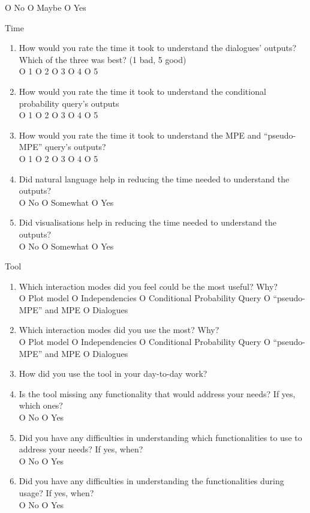 \begin{mdframed}
\begin{enumerate}[resume]
		O No O Maybe O Yes\\
	\end{enumerate}
	{\Large Time}
	\begin{enumerate}[resume]
		\item How would you rate the time it took to understand the dialogues' outputs?  Which of the three was best? (1 bad, 5 good) \\
		O 1 O 2 O 3 O 4 O 5
		\item How would you rate the time it took to understand the conditional probability query's outputs \\
		O 1 O 2 O 3 O 4 O 5
		\item How would you rate the time it took to understand the MPE and \enquote{pseudo-MPE} query's outputs? \\
		O 1 O 2 O 3 O 4 O 5
		\item Did natural language help in reducing the time needed to understand the outputs? \\
		O No O Somewhat O Yes
		\item Did visualisations help in reducing the time needed to understand the outputs? \\
		O No O Somewhat O Yes
	\end{enumerate}
	{\Large Tool}
	\begin{enumerate}[resume]
		\item Which interaction modes did you feel could be the most useful?  Why? \\
		O Plot model O Independencies O Conditional Probability Query O \enquote{pseudo-MPE} and MPE O Dialogues
		\item Which interaction modes did you use the most?  Why? \\
		O Plot model O Independencies O Conditional Probability Query O \enquote{pseudo-MPE} and MPE O Dialogues
		\item How did you use the tool in your day-to-day work?
		\item Is the tool missing any functionality that would address your needs?  If yes, which ones? \\
		O No O Yes
		\item Did you have any difficulties in understanding which functionalities to use to address your needs?  If yes, when? \\
		O No O Yes
		\item Did you have any difficulties in understanding the functionalities during usage?  If yes, when? \\
		O No O Yes

\end{enumerate}
\end{mdframed}
